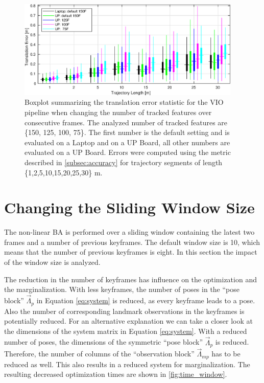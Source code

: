 \begin{figure}[H]
\centering
\includegraphics[width=0.95\textwidth]{images/acc_features}
\caption{Boxplot summarizing the translation error statistic for the \ac{VIO} 
pipeline when changing the number of tracked features over consecutive frames.  
The analyzed number of tracked features are \{150, 125, 100, 75\}. The first 
number is the default setting and is evaluated on a Laptop and on a UP Board, 
all other numbers are evaluated on a UP Board. Errors were computed using the 
metric described in \autoref{subsec:accuracy} for trajectory segments of length 
\{1,2,5,10,15,20,25,30\} m.}
\label{fig:acc_feature}
\end{figure}


\section{Changing the Sliding Window Size}\label{sec:slidingWindow}
The non-linear \ac{BA} is performed over a sliding window containing the latest 
two frames and a number of previous keyframes. The default window size is 10, 
which means that the number of previous keyframes is eight. In this section the 
impact of the window size is analyzed. 

The reduction in the number of keyframes has influence on the optimization and 
the marginalization. With less keyframes, the number of poses in the ``pose 
block'' $\vec{\Lambda}_{p}$ in Equation \eqref{eq:system} is reduced, as every 
keyframe leads to a pose. Also the number of corresponding landmark observations 
in the keyframes is potentially reduced. For an alternative explanation we can 
take a closer look at the dimensions of the system matrix in Equation 
\eqref{eq:system}. With a reduced number of poses, the dimensions of the 
symmetric ``pose block'' $\vec{\Lambda}_{p}$ is reduced. Therefore, the number 
of columns of the ``observation block'' $\vec{\Lambda}_{mp}$ has to be reduced 
as well. This also results in a reduced system for marginalization. The 
resulting decreased optimization times are shown in \autoref{fig:time_window}.

